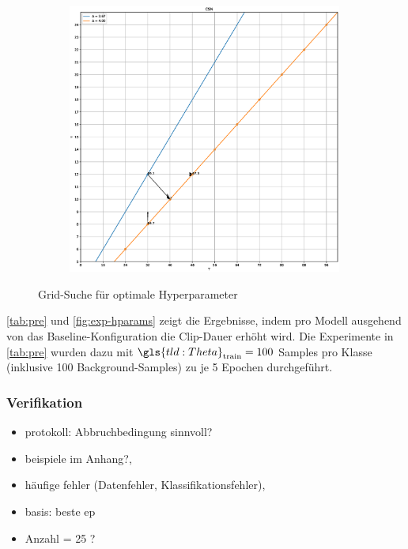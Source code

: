 \begin{figure}
    \begin{subfigure}{.33\textwidth}
        \centering
        \includegraphics[width=0.99\textwidth, height=0.8\textwidth, keepaspectratio, interpolate]{img/07_grid_csn.eps}
    \end{subfigure}
    \caption{Grid-Suche für optimale Hyperparameter}
    \label{fig:exp-hparams}
\end{figure}

\autoref{tab:pre} und \autoref{fig:exp-hparams} zeigt die Ergebnisse, indem pro Modell ausgehend von das Baseline-Konfiguration die Clip-Dauer erhöht wird.
Die Experimente in \autoref{tab:pre} wurden dazu mit $\gls{tld:Theta}_\text{train} = 100$ Samples pro Klasse (inklusive 100 Background-Samples) zu je 5 Epochen durchgeführt.

\subsubsection{Verifikation}

\begin{tcolorbox}[title=Todo]
    \begin{itemize}
        \item protokoll: Abbruchbedingung sinnvoll?
        \item beispiele im Anhang?,
        \item häufige fehler (Datenfehler, Klassifikationsfehler),
        \item basis: beste ep
        \item Anzahl = 25 ?
    \end{itemize}
\end{tcolorbox}


